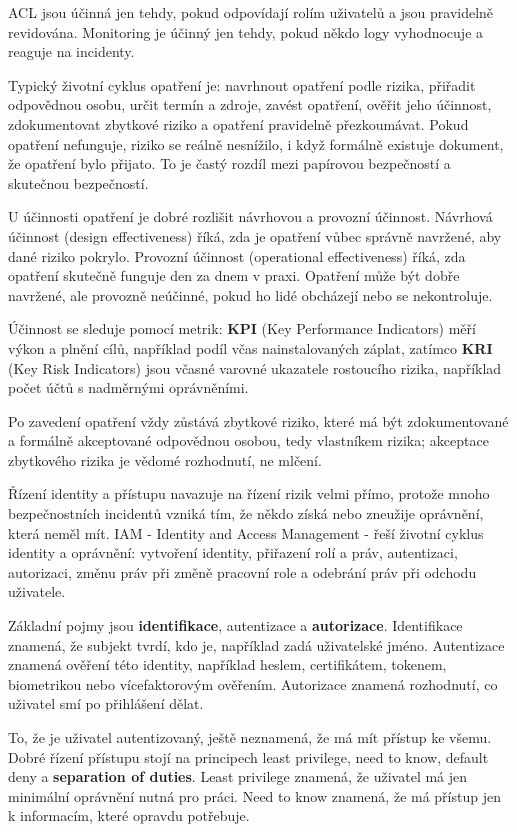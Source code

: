 ACL jsou účinná jen tehdy, pokud odpovídají rolím uživatelů a jsou pravidelně revidována. Monitoring je účinný jen tehdy, pokud někdo logy vyhodnocuje a reaguje na incidenty.

Typický životní cyklus opatření je: navrhnout opatření podle rizika, přiřadit odpovědnou osobu, určit termín a zdroje, zavést opatření, ověřit jeho účinnost, zdokumentovat zbytkové riziko a opatření pravidelně přezkoumávat. Pokud opatření nefunguje, riziko se reálně nesnížilo, i když formálně existuje dokument, že opatření bylo přijato. To je častý rozdíl mezi papírovou bezpečností a skutečnou bezpečností.

U účinnosti opatření je dobré rozlišit návrhovou a provozní účinnost. Návrhová účinnost (design effectiveness) říká, zda je opatření vůbec správně navržené, aby dané riziko pokrylo. Provozní účinnost (operational effectiveness) říká, zda opatření skutečně funguje den za dnem v praxi. Opatření může být dobře navržené, ale provozně neúčinné, pokud ho lidé obcházejí nebo se nekontroluje.

Účinnost se sleduje pomocí metrik: \textbf{KPI} (Key Performance Indicators) měří výkon a plnění cílů, například podíl včas nainstalovaných záplat, zatímco \textbf{KRI} (Key Risk Indicators) jsou včasné varovné ukazatele rostoucího rizika, například počet účtů s nadměrnými oprávněními.

Po zavedení opatření vždy zůstává zbytkové riziko, které má být zdokumentované a formálně akceptované odpovědnou osobou, tedy vlastníkem rizika; akceptace zbytkového rizika je vědomé rozhodnutí, ne mlčení.

Řízení identity a přístupu navazuje na řízení rizik velmi přímo, protože mnoho bezpečnostních incidentů vzniká tím, že někdo získá nebo zneužije oprávnění, která neměl mít. IAM - Identity and Access Management - řeší životní cyklus identity a oprávnění: vytvoření identity, přiřazení rolí a práv, autentizaci, autorizaci, změnu práv při změně pracovní role a odebrání práv při odchodu uživatele.

Základní pojmy jsou \textbf{identifikace}, autentizace a \textbf{autorizace}. Identifikace znamená, že subjekt tvrdí, kdo je, například zadá uživatelské jméno. Autentizace znamená ověření této identity, například heslem, certifikátem, tokenem, biometrikou nebo vícefaktorovým ověřením. Autorizace znamená rozhodnutí, co uživatel smí po přihlášení dělat.

To, že je uživatel autentizovaný, ještě neznamená, že má mít přístup ke všemu. Dobré řízení přístupu stojí na principech least privilege, need to know, default deny a \textbf{separation of duties}. Least privilege znamená, že uživatel má jen minimální oprávnění nutná pro práci. Need to know znamená, že má přístup jen k informacím, které opravdu potřebuje.

